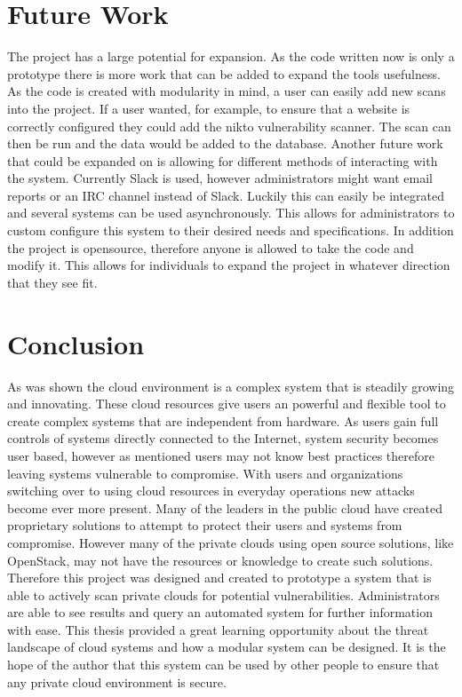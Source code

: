 \documentclass[12pt]{article}
\begin{document}
\section{Future Work}
The project has a large potential for expansion. As the code written now is only a prototype there is more work that can be added to expand the tools usefulness. As the code is created with modularity in mind, a user can easily add new scans into the project. If a user wanted, for example, to ensure that a website is correctly configured they could add the nikto \cite{NiktoScan} vulnerability scanner. The scan can then be run and the data would be added to the database. Another future work that could be expanded on is allowing for different methods of interacting with the system. Currently Slack is used, however administrators might want email reports or an IRC channel instead of Slack. Luckily this can easily be integrated and several systems can be used asynchronously. This allows for administrators to custom configure this system to their desired needs and specifications. In addition the project is opensource, therefore anyone is allowed to take the code and modify it. This allows for individuals to expand the project in whatever direction that they see fit.

\section{Conclusion}
As was shown the cloud environment is a complex system that is steadily growing and innovating. These cloud resources give users an powerful and flexible tool to create complex systems that are independent from hardware. As users gain full controls of systems directly connected to the Internet, system security becomes user based, however as mentioned users may not know best practices therefore leaving systems vulnerable to compromise. With users and organizations switching over to using cloud resources in everyday operations new attacks become ever more present. Many of the leaders in the public cloud have created proprietary solutions to attempt to protect their users and systems from compromise. However many of the private clouds using open source solutions, like OpenStack, may not have the resources or knowledge to create such solutions. Therefore this project was designed and created to prototype a system that is able to actively scan private clouds for potential vulnerabilities. Administrators are able to see results and query an automated system for further information with ease. This thesis provided a great learning opportunity about the threat landscape of cloud systems and how a modular system can be designed. It is the hope of the author that this system can be used by other people to ensure that any private cloud environment is secure.


\newpage


\newpage
\appendix

\end{document}
